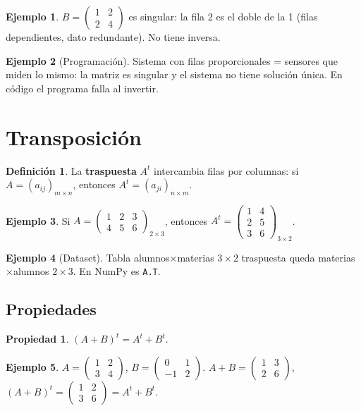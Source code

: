 \documentclass[a4paper,12pt]{article}
\theoremstyle{definition}
\newtheorem{definicion}{Definición}[section]
\newtheorem{ejemplo}{Ejemplo}[section]
\newtheorem{propiedad}{Propiedad}[section]
\begin{document}
\begin{ejemplo}
$B=\begin{pmatrix} 1 & 2 \\ 2 & 4 \end{pmatrix}$ es singular: la fila 2 es el doble de la 1 (filas dependientes, dato redundante). No tiene inversa.
\end{ejemplo}

\begin{ejemplo}[Programación]
Sistema con filas proporcionales = sensores que miden lo mismo: la matriz es singular y el sistema no tiene solución única. En código el programa falla al invertir.
\end{ejemplo}

\section{Transposición}
\begin{definicion}
La \textbf{traspuesta} $A^t$ intercambia filas por columnas: si $A=(a_{ij})_{m \times n}$, entonces $A^t=(a_{ji})_{n \times m}$.
\end{definicion}

\begin{ejemplo}
Si $A=\begin{pmatrix} 1 & 2 & 3 \\ 4 & 5 & 6 \end{pmatrix}_{2 \times 3}$, entonces $A^t=\begin{pmatrix} 1 & 4 \\ 2 & 5 \\ 3 & 6 \end{pmatrix}_{3 \times 2}$.
\end{ejemplo}

\begin{ejemplo}[Dataset]
Tabla alumnos$\times$materias $3 \times 2$ traspuesta queda materias$\times$alumnos $2 \times 3$. En NumPy es \texttt{A.T}.
\end{ejemplo}

\subsection{Propiedades}
\begin{propiedad}
$(A+B)^t = A^t+B^t$.
\end{propiedad}
\begin{ejemplo}
$A=\begin{pmatrix} 1 & 2 \\ 3 & 4 \end{pmatrix}$, $B=\begin{pmatrix} 0 & 1 \\ -1 & 2 \end{pmatrix}$. $A+B=\begin{pmatrix} 1 & 3 \\ 2 & 6 \end{pmatrix}$, $(A+B)^t=\begin{pmatrix} 1 & 2 \\ 3 & 6 \end{pmatrix} = A^t+B^t$.
\end{ejemplo}
\end{document}
